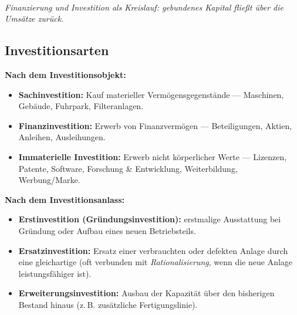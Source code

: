 \documentclass[11pt, a4paper]{article}
\begin{document}
\begin{center}
\\[0.3em]
{\small\itshape Finanzierung und Investition als Kreislauf: gebundenes Kapital fließt
über die Umsätze zurück.}
\end{center}

\subsection{Investitionsarten}

\textbf{Nach dem Investitionsobjekt:}
\begin{itemize}
  \item \textbf{Sachinvestition:} Kauf materieller Vermögensgegenstände --- Maschinen,
    Gebäude, Fuhrpark, Filteranlagen.
  \item \textbf{Finanzinvestition:} Erwerb von Finanzvermögen --- Beteiligungen, Aktien,
    Anleihen, Ausleihungen.
  \item \textbf{Immaterielle Investition:} Erwerb nicht körperlicher Werte --- Lizenzen,
    Patente, Software, Forschung \& Entwicklung, Weiterbildung, Werbung/Marke.
\end{itemize}

\textbf{Nach dem Investitionsanlass:}
\begin{itemize}
  \item \textbf{Erstinvestition (Gründungsinvestition):} erstmalige Ausstattung bei
    Gründung oder Aufbau eines neuen Betriebsteils.
  \item \textbf{Ersatzinvestition:} Ersatz einer verbrauchten oder defekten Anlage durch
    eine gleichartige (oft verbunden mit \emph{Rationalisierung}, wenn die neue Anlage
    leistungsfähiger ist).
  \item \textbf{Erweiterungsinvestition:} Ausbau der Kapazität über den bisherigen Bestand
    hinaus (z.\,B. zusätzliche Fertigungslinie).
\end{itemize}
\end{document}
